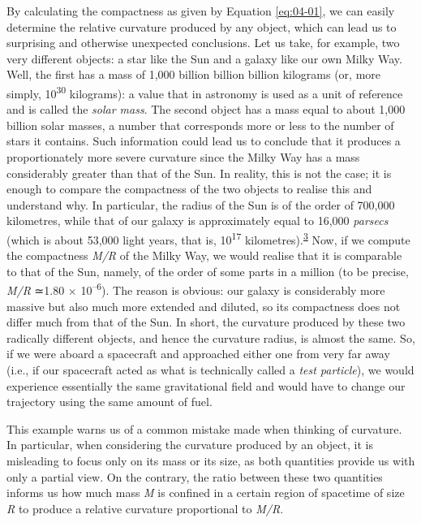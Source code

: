 By calculating the compactness as given by Equation \eqref{eq:04-01}, we can easily determine the
relative curvature produced by any object, which can lead us to surprising and otherwise
unexpected conclusions. Let us take, for example, two very different objects: a star
like the Sun and a galaxy like our own Milky Way. Well, the first has
a mass of 1,000 billion billion billion kilograms (or, more simply,
10\textsuperscript{30} kilograms): a value that in astronomy is used as a unit of
reference and is called the \emph{solar mass}. The second object has a mass equal to
about 1,000 billion solar masses, a number that corresponds more or less to the number
of stars it contains. Such information could lead us to conclude that it produces a
proportionately more severe curvature since the Milky Way has a mass
considerably greater than that of the Sun. In reality, this is not the case; it is
enough to compare the compactness of the two objects to realise this and understand why.
In particular, the radius of the Sun is of the order of 700,000 kilometres, while that
of our galaxy is approximately equal to 16,000 \emph{parsecs} (which is about 53,000
light years, that is, 10\textsuperscript{17} kilometres).\textsuperscript{\hyperlink{note:04-03}{3}} Now, if we
compute the compactness \emph{M/R} of the Milky
Way, we would realise that it is comparable to that of the Sun, namely, of the order of
some parts in a million (to be precise, \emph{M/R} ≃1.80 × 10\textsuperscript{--6}). The
reason is obvious: our galaxy is considerably more massive but also much more extended
and diluted, so its compactness does not differ much from that of the Sun. In short, the
curvature produced by these two radically different objects, and hence the curvature
radius, is almost the same. So, if we were aboard a spacecraft and approached either one
from very far away (i.e., if our spacecraft acted as what is technically called a
\emph{test particle}), we would experience essentially the same
gravitational field and would have to change our trajectory using the same amount of
fuel.

This example warns us of a common mistake made when thinking of curvature. In
particular, when considering the curvature produced by an object, it is misleading to
focus only on its mass or its size, as both quantities provide us with only a partial
view. On the contrary, the ratio between these two quantities informs us how much mass
\emph{M} is confined in a certain region of spacetime of size \emph{R} to produce a
relative curvature proportional to \emph{M/R}.

